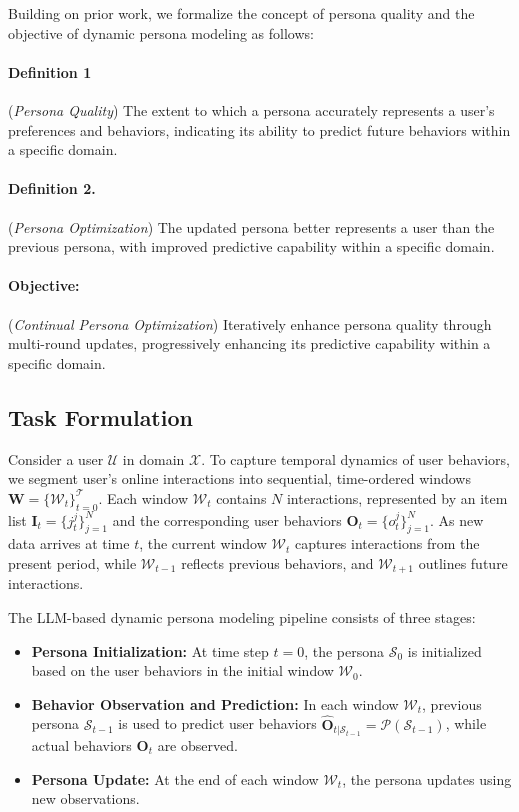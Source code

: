 
Building on prior work\cite{yang2023palr,kang2023llms,zhou2024language}, we formalize the concept of persona quality and the objective of dynamic persona modeling as follows:

\noindent
\paragraph{Definition 1} (\textit{Persona Quality})
The extent to which a persona accurately represents a user’s preferences and behaviors, indicating its ability to predict future behaviors within a specific domain.

\noindent
\paragraph{Definition 2.} (\textit{Persona Optimization})
The updated persona better represents a user than the previous persona, with improved predictive capability within a specific domain.

\noindent
\paragraph{Objective:} (\textit{Continual Persona Optimization})
Iteratively enhance persona quality through multi-round updates, progressively enhancing its predictive capability within a specific domain.






\subsection{Task Formulation}
Consider a user $\mathcal{U}$ in domain $\mathcal{X}$. 
To capture temporal dynamics of user behaviors, we segment user’s online interactions into sequential, time-ordered windows $\mathbf{W}=\{\mathcal{W}_t\}_{t=0}^\mathcal{T}$. 
Each window $\mathcal{W}_t$ contains $N$ interactions, represented by an item list $\mathbf{I}_t = \{j_{t}^{j}\}_{j=1}^N$ and the corresponding user behaviors $\mathbf{O}_t = \{o_{t}^{j}\}_{j=1}^N$. 
As new data arrives at time $t$, the current window $\mathcal{W}_t$ captures interactions from the present period, while $\mathcal{W}_{t-1}$ reflects previous behaviors, and $\mathcal{W}_{t+1}$ outlines future interactions.

The LLM-based dynamic persona modeling pipeline consists of three stages:
\begin{itemize}[noitemsep,left=0pt]
    \item \textbf{Persona Initialization:} At time step $t=0$, the persona $\mathcal{S}_0$ is initialized based on the user behaviors in the initial window $\mathcal{W}_0$.
    \item \textbf{Behavior Observation and Prediction:} In each window $\mathcal{W}_t$, previous persona $\mathcal{S}_{t-1}$ is used to predict user behaviors $\hat{\mathbf{O}}_{t|\mathcal{S}_{t-1}} = \mathcal{P}(\mathcal{S}_{t-1})$, while actual behaviors $\mathbf{O}_t$ are observed.
    \item \textbf{Persona Update:} At the end of each window $\mathcal{W}_t$, the persona updates using new observations.
\end{itemize}

